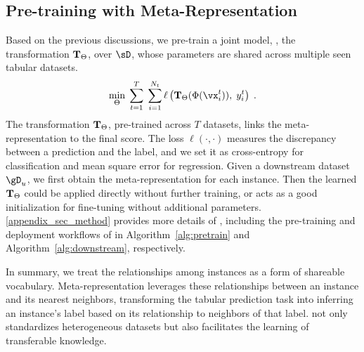 \subsection{Pre-training with Meta-Representation}
Based on the previous discussions, we pre-train a joint model, \ie, the transformation ${\bf T}_{\Theta}$, over $\sD$, whose parameters are shared across multiple seen tabular datasets.
\begin{equation}
\label{eq:objective}
\min_{\Theta}\;\sum_{t=1}^T\;\sum_{i=1}^{N_t}\ell\left({\bf T}_{\Theta}(\Phi(\vx_i^t)),\; y^t_i\right)\;.
\end{equation}
The transformation ${\bf T}_{\Theta}$, pre-trained across $T$ datasets, links the meta-representation to the final score. 
The loss $\ell(\cdot,\cdot)$ measures the discrepancy between a prediction and the label, and we set it as cross-entropy for classification and mean square error for regression.
Given a downstream dataset $\gD_u$, we first obtain the meta-representation for each instance. Then the learned ${\bf T}_{\Theta}$ could be applied directly without further training, or acts as a good initialization for fine-tuning without additional parameters. 
\autoref{appendix_sec_method} provides more details of \ours, including the pre-training and deployment workflows of \ours in Algorithm~\autoref{alg:pretrain} and Algorithm~\autoref{alg:downstream}, respectively. 

In summary, we treat the relationships among instances as a form of shareable vocabulary. Meta-representation leverages these relationships between an instance and its nearest neighbors, transforming the tabular prediction task into inferring an instance's label based on its relationship to neighbors of that label. \ours not only standardizes heterogeneous datasets but also facilitates the learning of transferable knowledge.
